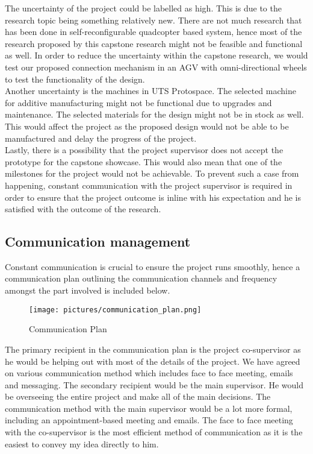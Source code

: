 \documentclass[12pt,A4]{article}
\begin{document}
	The uncertainty of the project could be labelled as high. This is due to the research topic being something relatively new. There are not much research that has been done in self-reconfigurable quadcopter based system, hence most of the research proposed by this capstone research might not be feasible and functional as well. In order to reduce the uncertainty within the capstone research, we would test our proposed connection mechanism in an AGV with omni-directional wheels to test the functionality of the design.\\
	
	Another uncertainty is the machines in UTS Protospace. The selected machine for additive manufacturing might not be functional due to upgrades and maintenance. The selected materials for the design might not be in stock as well. This would affect the project as the proposed design would not be able to be manufactured and delay the progress of the project.\\
	
	Lastly, there is a possibility that the project supervisor does not accept the prototype for the capstone showcase. This would also mean that one of the milestones for the project would not be achievable. To prevent such a case from happening, constant communication with the project supervisor is required in order to ensure that the project outcome is inline with his expectation and he is satisfied with the outcome of the research.\\
	
	\subsection{Communication management}
	
	Constant communication is crucial to ensure the project runs smoothly, hence a communication plan outlining the communication channels and frequency amongst the part involved is included below.\\
	
	\begin{figure}[h!]
		\texttt{[image: pictures/communication\_plan.png]}
		\caption{Communication Plan}
	\end{figure}
	
	The primary recipient in the communication plan is the project co-supervisor as he would be helping out with most of the details of the project. We have agreed on various communication method which includes face to face meeting, emails and messaging. The secondary recipient would be the main supervisor. He would be overseeing the entire project and make all of the main decisions. The communication method with the main supervisor would be a lot more formal, including an appointment-based meeting and emails. The face to face meeting with the co-supervisor is the most efficient method of communication as it is the easiest to convey my idea directly to him.\\
	
\end{document}
